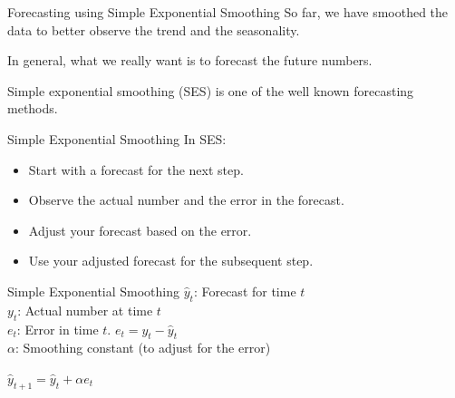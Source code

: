 \documentclass{beamer}\usepackage[]{graphicx}\usepackage[]{color}
\begin{document}
\begin{darkframes}
    
    \begin{frame}[fragile]{Forecasting using Simple Exponential Smoothing}
      \fontsize{9}{9}\selectfont
        So far, we have smoothed the data to better observe the trend and the seasonality.
        \bigskip
        
        In general, what we really want is to forecast the future numbers.
        \bigskip
        
        Simple exponential smoothing (SES) is one of the well known forecasting methods.
  
    \end{frame}
    
    
    
    \begin{frame}[fragile]{Simple Exponential Smoothing}
     \fontsize{9}{9}\selectfont
      In SES:
      
      \begin{itemize}[<+->]
        \item Start with a forecast for the next step.
        \item Observe the actual number and the error in the forecast.
        \item Adjust your forecast based on the error.
        \item Use your adjusted forecast for the subsequent step.
     \end{itemize}

    \end{frame}
    
    
    
    \begin{frame}[fragile]{Simple Exponential Smoothing}
     \fontsize{9}{9}\selectfont
      $\hat{y}_t$: Forecast for time $t$ \\
      $y_t$: Actual number at time $t$ \\ 
      $e_t$: Error in time $t$. $e_t = y_t - \hat{y}_t$ \\
      $\alpha$: Smoothing constant (to adjust for the error)
      \bigskip
      
      \begin{center}
          $ \hat{y}_{t+1} = \hat{y}_t + \alpha e_t $ \\ \bigskip
          

\end{center}
\end{frame}
\end{darkframes}
\end{document}

